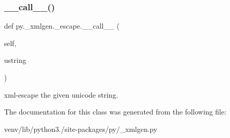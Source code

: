\subsubsection{\texorpdfstring{\+\_\+\+\_\+call\+\_\+\+\_\+()}{\_\_call\_\_()}}
{\footnotesize\ttfamily def py.\+\_\+xmlgen.\+\_\+escape.\+\_\+\+\_\+call\+\_\+\+\_\+ (\begin{DoxyParamCaption}\item[{}]{self,  }\item[{}]{ustring }\end{DoxyParamCaption})}

\begin{DoxyVerb}xml-escape the given unicode string. \end{DoxyVerb}
 

The documentation for this class was generated from the following file\+:\begin{DoxyCompactItemize}
\item 
venv/lib/python3./site-\/packages/py/\+\_\+xmlgen.\+py\end{DoxyCompactItemize}
